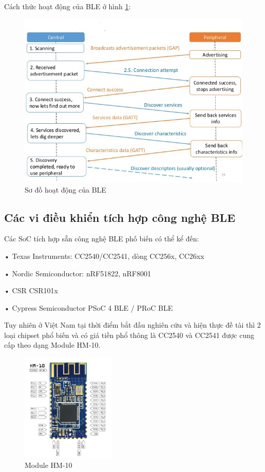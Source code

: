 Cách thức hoạt động của BLE ở hình \ref{fig: btwork}:
	\begin{figure}[h]
		\includegraphics[width=1.0\textwidth]{btwork}
		\caption[Sơ đồ hoạt động của BLE]{Sơ đồ hoạt động của BLE}
		\label{fig: btwork}
	\end{figure}
	
\newpage
\subsection{Các vi điều khiển tích hợp công nghệ BLE}
Các SoC tích hợp sẵn công nghệ BLE phố biến có thể kể đến:

• Texas Instruments: CC2540/CC2541, dòng CC256x, CC26xx

• Nordic Semiconductor: nRF51822, nRF8001

• CSR CSR101x

• Cypress Semiconductor PSoC 4 BLE / PRoC BLE

Tuy nhiên ở Việt Nam tại thời điểm bắt đầu nghiên cứu và hiện thực đề tài thì 2 loại chipset phổ biến và có giá tiền phổ thông là CC2540 và CC2541 được cung cấp theo dạng Module HM-10.
	\begin{figure}[h]
		\centering    
		\includegraphics[width=0.4\textwidth]{hm10}
		\caption[Module HM-10]{Module HM-10}
		\label{fig: hm10}
	\end{figure}

